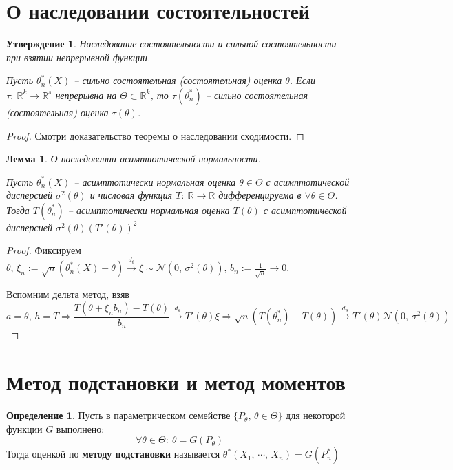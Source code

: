\documentclass[a4paper,12pt]{article}
\theoremstyle{plain}
\newtheorem{lemma}{Лемма}[section]
\newtheorem{proposition}{Утверждение}[section]
\theoremstyle{definition}
\newtheorem{definition}{Определение}[section]
\theoremstyle{remark}
\begin{document}
\section{О наследовании состоятельностей}
\begin{proposition}
  Наследование состоятельности и сильной состоятельности при взятии непрерывной функции.

  Пусть $\theta_n^*(X)$ -- сильно состоятельная (состоятельная) оценка $\theta$. Если $\tau:\:\mathbb{R}^k \to \mathbb{R}^s$ непрерывна на $\Theta \subset \mathbb{R}^k$, то $\tau(\theta_n^*)$ -- сильно состоятельная (состоятельная) оценка $\tau(\theta)$.
\end{proposition}

\begin{proof}
  Смотри доказательство теоремы о наследовании сходимости.
\end{proof}

\begin{lemma}
  О наследовании асимптотической нормальности.

  Пусть $\theta_n^*(X)$ -- асимптотически нормальная оценка $\theta \in \Theta$ с асимптотической дисперсией $\sigma^2(\theta)$ и числовая функция $T:\: \mathbb{R} \to \mathbb{R}$ дифференцируема в $\forall \theta \in \Theta$. Тогда $T(\theta^*_n)$ -- асимптотически нормальная оценка $T(\theta)$ с асимптотической дисперсией $\sigma^2(\theta)(T'(\theta))^2$
\end{lemma}

\begin{proof}
  Фиксируем $\theta,\, \xi_n := \sqrt{n}(\theta_n^*(X) - \theta) \overset{d_\theta}{\to} \xi \sim \mathcal{N}(0,\, \sigma^2(\theta)),\, b_n := \frac{1}{\sqrt{n}} \to 0$.

  Вспомним дельта метод, взяв 
  \[
    a = \theta,\, h = T \Rightarrow \frac{T(\theta + \xi_nb_n) - T(\theta)}{b_n} \overset{d_\theta}{\to} T'(\theta)\xi \Rightarrow \sqrt{n}(T(\theta_n^*) - T(\theta)) \overset{d_\theta}{\to} T'(\theta)\mathcal{N}(0,\, \sigma^2(\theta))
  \] 
\end{proof}

\section{Метод подстановки и метод моментов}
\begin{definition}
  Пусть в параметрическом семействе $\{P_\theta,\, \theta \in \Theta\}$ для некоторой функции $G$ выполнено:
  \[
    \forall \theta \in \Theta :\: \theta = G(P_\theta)
  \]
  Тогда оценкой по \textbf{методу подстановки} называется $\theta^*(X_1,\,\cdots,\,X_n) = G(P_n^*)$
\end{definition}
\end{document}
